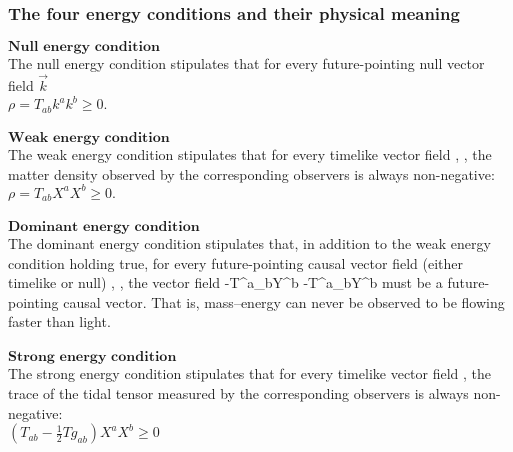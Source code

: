 \documentclass{article}
\begin{document}
\subsubsection{The four energy conditions and their physical meaning}
$ \textbf{Null energy condition}$\\
The null energy condition stipulates that for every future-pointing null vector field $\vec{k}$\\
${\displaystyle \rho =T_{ab}k^{a}k^{b}\geq 0.}$ \\
\\
$ \textbf{Weak energy condition}$\\
The weak energy condition stipulates that for every timelike vector field {,} {,} the matter density observed by the corresponding observers is always non-negative:\\
${\displaystyle \rho =T_{ab}X^{a}X^{b}\geq 0.}$
\\
\\
$ \textbf{Dominant energy condition}$\\
The dominant energy condition stipulates that, in addition to the weak energy condition holding true, for every future-pointing causal vector field (either timelike or null) {,} {,} the vector field {\displaystyle -{T^{a}}_{b}Y^{b}} {\displaystyle -{T^{a}}_{b}Y^{b}} must be a future-pointing causal vector. That is, mass–energy can never be observed to be flowing faster than light.\\
\\
$ \textbf{Strong energy condition}$\\
The strong energy condition stipulates that for every timelike vector field {} {}, the trace of the tidal tensor measured by the corresponding observers is always non-negative:\\
${\displaystyle \left(T_{ab}-{\frac {1}{2}} T g_{ab}\right)X^{a}X^{b}\geq 0}$ \\
\end{document}
